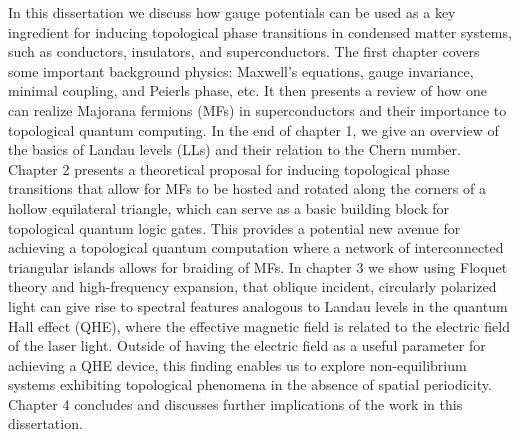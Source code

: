 In this dissertation we discuss how gauge potentials can be used as a key ingredient for inducing topological phase transitions in condensed matter systems, such as conductors, insulators, and superconductors.
The first chapter covers some important background physics: Maxwell's equations, gauge invariance, minimal coupling, and Peierls phase, etc.
It then presents a review of how one can realize Majorana fermions (MFs) in superconductors and their importance to topological quantum computing.
In the end of chapter 1, we give an overview of the basics of Landau levels (LLs) and their relation to the Chern number.
Chapter 2 presents a theoretical proposal for inducing topological phase transitions that allow for MFs to be hosted and rotated along the corners of a hollow equilateral triangle, which can serve as a basic building block for topological quantum logic gates.
This provides a potential new avenue for achieving a topological quantum computation where a network of interconnected triangular islands allows for braiding of MFs.
In chapter 3 we show using Floquet theory and high-frequency expansion, that oblique incident, circularly polarized light can give rise to spectral features analogous to Landau levels in the quantum Hall effect (QHE), where the effective magnetic field is related to the electric field of the laser light.
Outside of having the electric field as a useful parameter for achieving a QHE device, this finding enables us to explore non-equilibrium systems exhibiting topological phenomena in the absence of spatial periodicity.
Chapter 4 concludes and discusses further implications of the work in this dissertation.
